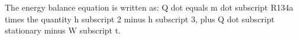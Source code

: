 The energy balance equation is written as: Q dot equals m dot subscript R134a times the quantity h subscript 2 minus h subscript 3, plus Q dot subscript stationary minus W subscript t.